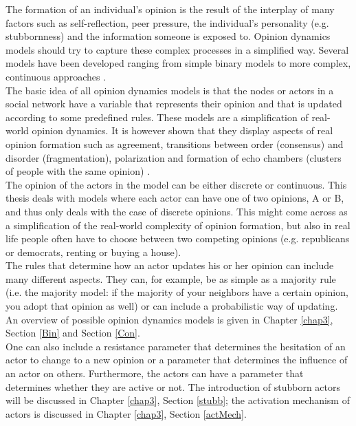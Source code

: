 \documentclass[11 pt , letterpaper , twoside , openright]{book}
\begin{document}
The formation of an individual's opinion is the result of the interplay of many factors such as self-reflection, peer pressure, the individual's personality (e.g. stubbornness) and the information someone is exposed to. Opinion dynamics models should try to capture these complex processes in a simplified way. Several models have been developed ranging from simple binary models to more complex, continuous approaches \cite{Sirbu2016}.\\
\newline
The basic idea of all opinion dynamics models is that the nodes or actors in a social network have a variable that represents their opinion and that is updated according to some predefined rules. These models are a simplification of real-world opinion dynamics. It is however shown that they display aspects of real opinion formation such as agreement, transitions between order (consensus) and disorder (fragmentation), polarization and formation of echo chambers (clusters of people with the same opinion) \cite{Sirbu2016}. \\
\newline
The opinion of the actors in the model can be either discrete or continuous. This thesis deals with models where each actor can have one of two opinions, A or B, and thus only deals with the case of discrete opinions. This might come across as a simplification of the real-world complexity of opinion formation, but also in real life people often have to choose between two competing opinions (e.g. republicans or democrats, renting or buying a house). \\
\newline
The rules that determine how an actor updates his or her opinion can include many different aspects. They can, for example, be as simple as a majority rule (i.e. the majority model: if the majority of your neighbors have a certain opinion, you adopt that opinion as well) or can include a probabilistic way of updating. An overview of possible opinion dynamics models is given in Chapter \ref{chap3}, Section \ref{Bin} and Section \ref{Con}. \\
\newline
One can also include a resistance parameter that determines the hesitation of an actor to change to a new opinion or a parameter that determines the influence of an actor on others. Furthermore, the actors can have a parameter that determines whether they are active or not. The introduction of stubborn actors will be discussed in Chapter \ref{chap3}, Section \ref{stubb}; the activation mechanism of actors is discussed in Chapter \ref{chap3}, Section \ref{actMech}.\\
\end{document}
